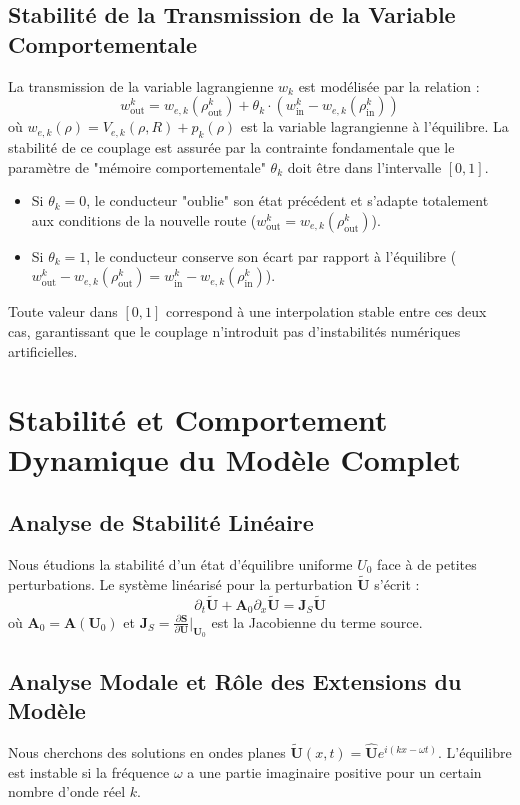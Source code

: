 \subsection{Stabilité de la Transmission de la Variable Comportementale}
La transmission de la variable lagrangienne $w_k$ est modélisée par la relation :
\[ w_{\text{out}}^k = w_{e,k}(\rho_{\text{out}}^k) + \theta_k \cdot (w_{\text{in}}^k - w_{e,k}(\rho_{\text{in}}^k)) \]
où $w_{e,k}(\rho) = V_{e,k}(\rho,R) + p_k(\rho)$ est la variable lagrangienne à l'équilibre.
La stabilité de ce couplage est assurée par la contrainte fondamentale que le paramètre de "mémoire comportementale" $\theta_k$ doit être dans l'intervalle $[0,1]$.
\begin{itemize}
    \item Si $\theta_k = 0$, le conducteur "oublie" son état précédent et s'adapte totalement aux conditions de la nouvelle route ($w_{\text{out}}^k = w_{e,k}(\rho_{\text{out}}^k)$).
    \item Si $\theta_k = 1$, le conducteur conserve son écart par rapport à l'équilibre ($w_{\text{out}}^k - w_{e,k}(\rho_{\text{out}}^k) = w_{\text{in}}^k - w_{e,k}(\rho_{\text{in}}^k)$).
\end{itemize}
Toute valeur dans $[0,1]$ correspond à une interpolation stable entre ces deux cas, garantissant que le couplage n'introduit pas d'instabilités numériques artificielles.

\section{Stabilité et Comportement Dynamique du Modèle Complet}
\subsection{Analyse de Stabilité Linéaire}
Nous étudions la stabilité d'un état d'équilibre uniforme $U_0$ face à de petites perturbations. Le système linéarisé pour la perturbation $\tilde{\mathbf{U}}$ s'écrit :
\[ \partial_t \tilde{\mathbf{U}} + \mathbf{A}_0 \partial_x \tilde{\mathbf{U}} = \mathbf{J}_S \tilde{\mathbf{U}} \]
où $\mathbf{A}_0 = \mathbf{A}(\mathbf{U}_0)$ et $\mathbf{J}_S = \frac{\partial \mathbf{S}}{\partial \mathbf{U}}|_{\mathbf{U}_0}$ est la Jacobienne du terme source.

\subsection{Analyse Modale et Rôle des Extensions du Modèle}
Nous cherchons des solutions en ondes planes $\tilde{\mathbf{U}}(x,t) = \hat{\mathbf{U}} e^{i(kx - \omega t)}$. L'équilibre est instable si la fréquence $\omega$ a une partie imaginaire positive pour un certain nombre d'onde réel $k$.


